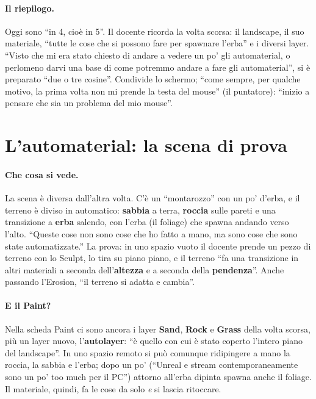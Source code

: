 \paragraph{Il riepilogo.} Oggi sono ``in 4, cioè in 5''. Il docente ricorda la volta
scorsa: il landscape, il suo materiale, ``tutte le cose che si possono fare per spawnare
l'erba'' e i diversi layer. ``Visto che mi era stato chiesto di andare a vedere un po' gli
automaterial, o perlomeno darvi una base di come potremmo andare a fare gli
automaterial'', si è preparato ``due o tre cosine''. Condivide lo schermo; ``come sempre,
per qualche motivo, la prima volta non mi prende la testa del mouse'' (il puntatore):
``inizio a pensare che sia un problema del mio mouse''.

\section{L'automaterial: la scena di prova}
\label{ue15:sec:scena}

\paragraph{Che cosa si vede.} La scena è diversa dall'altra volta. C'è un ``montarozzo''
con un po' d'erba, e il terreno è diviso in automatico: \textbf{sabbia} a terra,
\textbf{roccia} sulle pareti e una transizione a \textbf{erba} salendo, con l'erba (il
foliage) che spawna andando verso l'alto. ``Queste cose non sono cose che ho fatto a mano,
ma sono cose che sono state automatizzate.'' La prova: in uno spazio vuoto il docente
prende un pezzo di terreno con lo Sculpt, lo tira su piano piano, e il terreno ``fa una
transizione in altri materiali a seconda dell'\textbf{altezza} e a seconda della
\textbf{pendenza}''. Anche passando l'Erosion, ``il terreno si adatta e cambia''.

\paragraph{E il Paint?} Nella scheda Paint ci sono ancora i layer \textbf{Sand},
\textbf{Rock} e \textbf{Grass} della volta scorsa, più un layer nuovo, l'\textbf{autolayer}:
``è quello con cui è stato coperto l'intero piano del landscape''. In uno spazio remoto si
può comunque ridipingere a mano la roccia, la sabbia e l'erba; dopo un po' (``Unreal e
stream contemporaneamente sono un po' too much per il PC'') attorno all'erba dipinta spawna
anche il foliage. Il materiale, quindi, fa le cose da solo \emph{e} si lascia ritoccare.

